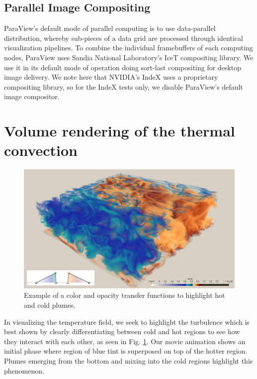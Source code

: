 \documentclass[final,5p,times,twocolumn]{elsarticle}
\begin{document}
\subsection{Parallel Image Compositing}

ParaView's default mode of parallel computing is to use data-parallel distribution,
whereby sub-pieces of a data grid are processed through identical visualization
pipelines. To combine the individual framebuffers of each computing nodes,
ParaView uses Sandia National Laboratory's IceT \cite{Moreland2011} compositing
library. We use it in its default mode of operation doing sort-last compositing
for desktop image delivery. We note here that NVIDIA's IndeX uses a proprietary
compositing library, so for the IndeX tests only, we disable ParaView's default
image compositor.

\section{Volume rendering of the thermal convection}

\begin{figure}[!hbt]
	\centering
	\includegraphics[width=\linewidth]{zoom0000.pdf}%
	\caption{\label{fig:zoom} Example of a color and opacity transfer functions to highlight hot and cold plumes.}
\end{figure}


In visualizing the temperature field, we seek to highlight the turbulence which
is best shown by clearly differentiating between cold and hot regions to see how
they interact with each other, as seen in Fig. \ref{fig:zoom}. Our movie animation shows an initial phase where
region of blue tint is superposed on top of the hotter region. Plumes emerging
from the bottom and mixing into the cold regions highlight this phenomenon.
\end{document}
